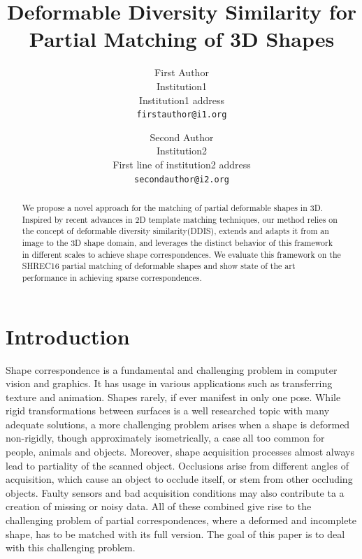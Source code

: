 \documentclass[10pt,twocolumn,letterpaper]{article}
\begin{document}
\title{Deformable Diversity Similarity for Partial Matching of 3D Shapes}

\author{First Author\\
Institution1\\
Institution1 address\\
{\tt\small firstauthor@i1.org}
\and
Second Author\\
Institution2\\
First line of institution2 address\\
{\tt\small secondauthor@i2.org}
}

\maketitle

\begin{abstract}
We propose a novel approach for the matching of partial deformable shapes in 3D. Inspired by recent advances in 2D template matching techniques, our method relies on the concept of deformable diversity similarity(DDIS), extends and adapts it from an image to the 3D shape domain, and leverages the distinct behavior of this framework in different scales to achieve shape correspondences. We evaluate this framework on the SHREC16 partial matching of deformable shapes and show state of the art performance in achieving sparse correspondences.
\end{abstract}

\section{Introduction}

Shape correspondence is a fundamental and challenging problem in computer vision and graphics. It has usage in various applications such as transferring texture and animation. Shapes rarely, if ever manifest in only one pose. While rigid transformations between surfaces is a well researched topic with many adequate solutions, a more challenging problem arises when a shape is deformed non-rigidly, though approximately isometrically, a case all too common for people, animals and objects.
Moreover, shape acquisition processes almost always lead to partiality of the scanned object. Occlusions arise from different angles of acquisition, which cause an object to occlude itself,  or stem from other occluding objects. Faulty sensors and bad acquisition conditions may also contribute ta a creation of missing or noisy data.
All of these combined give rise to the challenging problem of partial correspondences, where a deformed and incomplete shape, has to be matched with its full version. The goal of this paper is to deal with this challenging problem.
\end{document}

